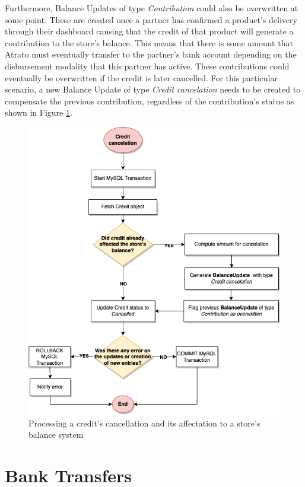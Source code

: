 Furthermore, Balance Updates of type \textit{Contribution} could also be overwritten at some point. These are created once a partner has confirmed a product’s delivery through their dashboard causing that the credit of that product will generate a contribution to the store’s balance. This means that there is some amount that Atrato must eventually transfer to the partner’s bank account depending on the disbursement modality that this partner has active. These contributions could eventually be overwritten if the credit is later cancelled. For this particular scenario, a new Balance Update of type \textit{Credit cancelation} needs to be created to compensate the previous contribution, regardless of the contribution’s status as shown in Figure \ref{fig:dlowchart_credit_cancelation}.


\begin{figure} [H]
    \centering
    \includegraphics[scale = 0.6]{assets/diagrams/CancelationFlowChart.png}
    \caption{Processing a credit's cancellation and its affectation to a store's balance system}\label{fig:dlowchart_credit_cancelation}
\end{figure}

\section{Bank Transfers}

